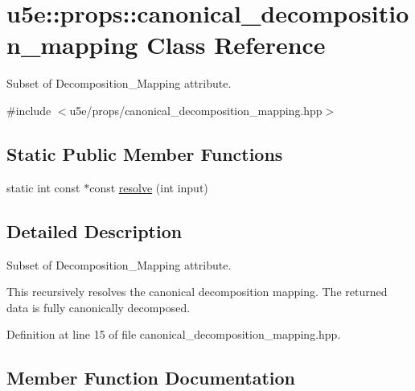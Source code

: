 \hypertarget{classu5e_1_1props_1_1canonical__decomposition__mapping}{}\section{u5e\+:\+:props\+:\+:canonical\+\_\+decomposition\+\_\+mapping Class Reference}
\label{classu5e_1_1props_1_1canonical__decomposition__mapping}


Subset of Decomposition\+\_\+\+Mapping attribute.  




{\ttfamily \#include $<$u5e/props/canonical\+\_\+decomposition\+\_\+mapping.\+hpp$>$}

\subsection*{Static Public Member Functions}
\begin{DoxyCompactItemize}
\item 
static int const $\ast$const \hyperlink{classu5e_1_1props_1_1canonical__decomposition__mapping_a330770acf7984c3c7d778d6dea56067a}{resolve} (int input)
\end{DoxyCompactItemize}


\subsection{Detailed Description}
Subset of Decomposition\+\_\+\+Mapping attribute. 

This recursively resolves the canonical decomposition mapping. The returned data is fully canonically decomposed. 

Definition at line 15 of file canonical\+\_\+decomposition\+\_\+mapping.\+hpp.



\subsection{Member Function Documentation}
